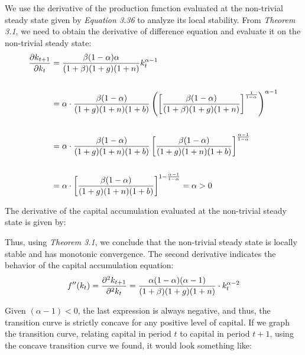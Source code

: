 \bigskip
We use the derivative of the production function evaluated at the non-trivial steady state given by \textit{Equation 3.36} to analyze its local stability. From \textit{Theorem 3.1}, we need to obtain the derivative of difference equation and evaluate it on the non-trivial steady state:
\begin{align*}
\dfrac{\partial k_{t+1}}{\partial k_t} &= \dfrac{\beta(1-\alpha)\alpha}{(1+\beta)(1+g)(1+n)} k_t^{\alpha-1} \\
\\
&= \alpha\cdot \dfrac{\beta(1-\alpha)}{(1+g)(1+n)(1+b)} \left(   \left[ \dfrac{\beta(1-\alpha)}{(1+\beta)(1+g)(1+n)} \right]^{\frac{1}{1-\alpha}}  \right)^{\alpha-1} \\
\\
&= \alpha\cdot \dfrac{\beta(1-\alpha)}{(1+g)(1+n)(1+b)} \left[ \dfrac{\beta(1-\alpha)}{(1+g)(1+n)(1+b)} \right] ^{\frac{\alpha-1}{1-\alpha}} \\
\\
&= \alpha\cdot \left[ \dfrac{\beta(1-\alpha)}{(1+g)(1+n)(1+b)} \right] ^{1-\frac{\alpha-1}{1-\alpha}} = \alpha >0
\end{align*}

The derivative of the capital accumulation evaluated at the non-trivial steady state is given by:

Thus, using \textit{Theorem 3.1}, we conclude that the non-trivial steady state is locally stable and has monotonic convergence. The second derivative indicates the behavior of the capital accumulation equation:
$$f''(k_t)=\dfrac{\partial ^2k_{t+1}}{\partial ^2k_t}=\dfrac{\alpha (1-\alpha)(\alpha-1)}{(1+\beta)(1+g)(1+n)}\cdot k_t^{\alpha-2}$$

Given $(\alpha-1)<0$, the last expression is always negative, and thus, the transition curve is strictly concave for any positive level of capital. If we graph the transition curve, relating capital in period $t$ to capital in period $t+1$, using the concave transition curve we found, it would look something like:

